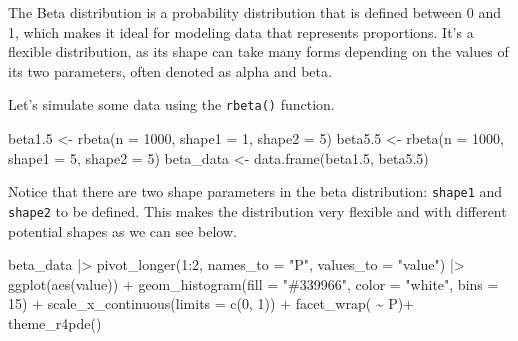 \documentclass[
  letterpaper,
]{book}
\newenvironment{Shaded}{\begin{snugshade}}{\end{snugshade}}
\newcommand{\AttributeTok}[1]{\textcolor[rgb]{0.40,0.45,0.13}{#1}}
\newcommand{\DecValTok}[1]{\textcolor[rgb]{0.68,0.00,0.00}{#1}}
\newcommand{\FloatTok}[1]{\textcolor[rgb]{0.68,0.00,0.00}{#1}}
\newcommand{\FunctionTok}[1]{\textcolor[rgb]{0.28,0.35,0.67}{#1}}
\newcommand{\NormalTok}[1]{\textcolor[rgb]{0.00,0.23,0.31}{#1}}
\newcommand{\OtherTok}[1]{\textcolor[rgb]{0.00,0.23,0.31}{#1}}
\newcommand{\SpecialCharTok}[1]{\textcolor[rgb]{0.37,0.37,0.37}{#1}}
\newcommand{\StringTok}[1]{\textcolor[rgb]{0.13,0.47,0.30}{#1}}
\begin{document}
The Beta distribution is a probability distribution that is defined
between 0 and 1, which makes it ideal for modeling data that represents
proportions. It's a flexible distribution, as its shape can take many
forms depending on the values of its two parameters, often denoted as
alpha and beta.

Let's simulate some data using the \texttt{rbeta()} function.

\begin{Shaded}
\begin{Highlighting}[]
\NormalTok{beta1}\FloatTok{.5} \OtherTok{\textless{}{-}} \FunctionTok{rbeta}\NormalTok{(}\AttributeTok{n =} \DecValTok{1000}\NormalTok{, }\AttributeTok{shape1 =} \DecValTok{1}\NormalTok{, }\AttributeTok{shape2 =} \DecValTok{5}\NormalTok{)}
\NormalTok{beta5}\FloatTok{.5} \OtherTok{\textless{}{-}} \FunctionTok{rbeta}\NormalTok{(}\AttributeTok{n =} \DecValTok{1000}\NormalTok{, }\AttributeTok{shape1 =} \DecValTok{5}\NormalTok{, }\AttributeTok{shape2 =} \DecValTok{5}\NormalTok{)}
\NormalTok{beta\_data }\OtherTok{\textless{}{-}} \FunctionTok{data.frame}\NormalTok{(beta1}\FloatTok{.5}\NormalTok{, beta5}\FloatTok{.5}\NormalTok{)}
\end{Highlighting}
\end{Shaded}

Notice that there are two shape parameters in the beta distribution:
\texttt{shape1} and \texttt{shape2} to be defined. This makes the
distribution very flexible and with different potential shapes as we can
see below.

\begin{Shaded}
\begin{Highlighting}[]
\NormalTok{beta\_data }\SpecialCharTok{|\textgreater{}}
  \FunctionTok{pivot\_longer}\NormalTok{(}\DecValTok{1}\SpecialCharTok{:}\DecValTok{2}\NormalTok{, }\AttributeTok{names\_to =} \StringTok{"P"}\NormalTok{,}
               \AttributeTok{values\_to =} \StringTok{"value"}\NormalTok{) }\SpecialCharTok{|\textgreater{}}
  \FunctionTok{ggplot}\NormalTok{(}\FunctionTok{aes}\NormalTok{(value)) }\SpecialCharTok{+}
  \FunctionTok{geom\_histogram}\NormalTok{(}\AttributeTok{fill =} \StringTok{"\#339966"}\NormalTok{,}
                 \AttributeTok{color =} \StringTok{"white"}\NormalTok{,}
                 \AttributeTok{bins =} \DecValTok{15}\NormalTok{) }\SpecialCharTok{+}
  \FunctionTok{scale\_x\_continuous}\NormalTok{(}\AttributeTok{limits =} \FunctionTok{c}\NormalTok{(}\DecValTok{0}\NormalTok{, }\DecValTok{1}\NormalTok{)) }\SpecialCharTok{+}
  \FunctionTok{facet\_wrap}\NormalTok{( }\SpecialCharTok{\textasciitilde{}}\NormalTok{ P)}\SpecialCharTok{+}
  \FunctionTok{theme\_r4pde}\NormalTok{()}
\end{Highlighting}
\end{Shaded}
\end{document}
